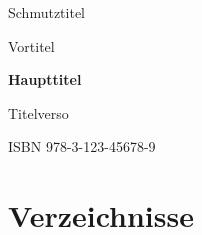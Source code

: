 \documentclass[open=any, index=totoc, paper=160mm:234mm, chapterprefix=true,
	fontsize=10pt, DIV=10, BCOR=12mm]{scrbook}
\begin{document}
\frontmatter
%
\frontmatter
\thispagestyle{empty}
\vspace*{\fill}
\begin{center}Schmutztitel\end{center}

\clearpage\thispagestyle{empty}
\begin{center}{\LARGE Vortitel}\end{center}

\clearpage\thispagestyle{empty}\begin{center}\vspace*{3\baselineskip}
\textbf{\LARGE Haupttitel}

\end{center}
\clearpage\thispagestyle{empty}
\noindent Titelverso

\vspace{25\baselineskip}

\vfill
\noindent ISBN 978-3-123-45678-9

\setcounter{page}{4}
\tableofcontents

\frontmatter

\mainmatter


\backmatter
\part*{Verzeichnisse}
\end{document}
